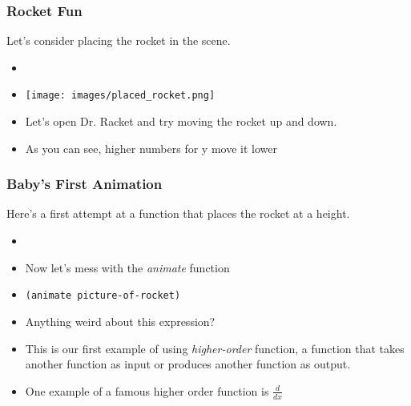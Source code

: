 \documentclass{beamer}
\begin{document}
\begin{frame}
  \frametitle{Rocket Fun}
  Let's consider placing the rocket in the scene.
  \begin{itemize}
  \item \placeRocket
  \item<1-> \texttt{[image: images/placed\_rocket.png]}
  \item<2-> Let's open Dr. Racket and try moving the rocket up and down.
  \item<3-> As you can see, higher numbers for y move it lower
  \end{itemize}
\end{frame}




\begin{frame}
  \frametitle{Baby's First Animation}
  Here's a first attempt at a function that places the rocket at a height.
  \begin{itemize}
  \item \placeRocket
  \item<1-> Now let's mess with the \emph{animate} function
  \item<2-> \texttt{(animate picture-of-rocket)}
  \item<3-> Anything weird about this expression?
  \item<4-> This is our first example of using \emph{higher-order} function,
    a function that takes another function as input or produces another function
    as output.
  \item<5-> One example of a famous higher order function is $\frac{d}{dx}$
  \end{itemize}
\end{frame}
\end{document}

